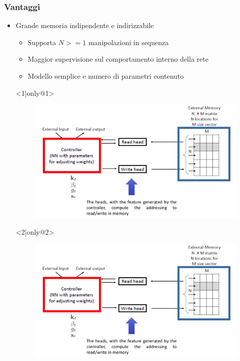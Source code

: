 \documentclass{beamer}
\begin{document}
\begin{frame}
\frametitle{Vantaggi}
\begin{itemize} 
\item <1-> Grande memoria indipendente e indirizzabile
\begin{itemize}
	\item <2-> Supporta $N >= 1$ manipolazioni in sequenza
	\item <3-> Maggior supervisione sul comportamento interno della rete 
	\item <4-> Modello semplice e numero di parametri contenuto
\end{itemize}
\item[] <1|only@1> 
\begin{figure}[!h]
 			\begin{center}
 			\includegraphics[scale=0.18]{"Immagini/MANN.png"}
 			\end{center}
\end{figure}
\item[] <2|only@2> 
\begin{figure}[!h]
 			\begin{center}
 			\includegraphics[scale=0.18]{"Immagini/MANN.png"}

\end{center}
\end{figure}
\end{itemize}
\end{frame}
\end{document}

